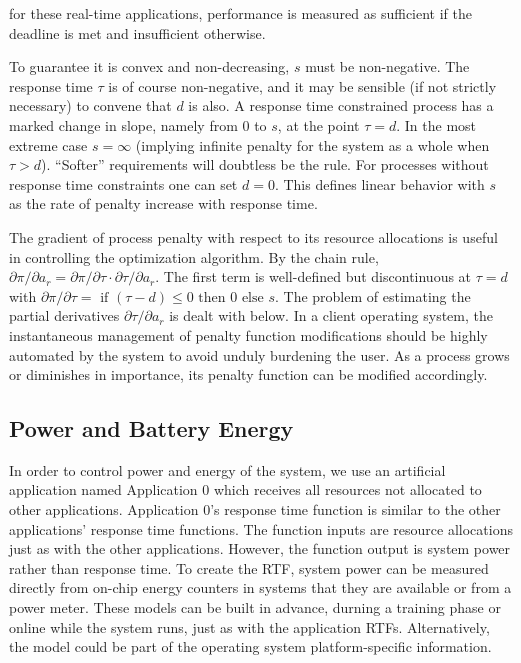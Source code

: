 for these real-time applications, performance is measured as sufficient if the deadline is met and insufficient otherwise.

To guarantee it is convex and non-decreasing, $s$ must be non-negative.
The response time $\tau$  is of course non-negative,
and it may be sensible (if not strictly necessary) to convene that $d$ is also.
A response time constrained process has a marked change in slope, namely from 0 to $s$, at the point $\tau= d$.
In the most extreme case $s = \infty$ (implying infinite penalty for the system as a whole when $\tau > d$).  ``Softer'' requirements will doubtless be the rule.
For processes without response time constraints one can set $d = 0$.
This defines linear behavior with $s$ as the rate of penalty increase with response time.

The gradient of process penalty with respect to its resource allocations is useful in controlling the optimization algorithm.
By the chain rule, $\partial\pi/\partial a_r = \partial\pi/\partial\tau\cdot\partial\tau/\partial a_r$.
The first term is well-defined but discontinuous at $\tau = d$ with
$\partial\pi/\partial\tau = \mbox{ if } (\tau - d) \leq 0 \mbox{ then } 0 \mbox{ else } s$.
The problem of estimating the partial derivatives $\partial\tau/\partial a_r$ is dealt with below.
In a client operating system, the instantaneous management of penalty function modifications
should be highly automated by the system to avoid unduly burdening the user.
As a process grows or diminishes in importance, its penalty function can be modified accordingly.

\subsection*{Power and Battery Energy}
In order to control power and energy of the system, we use an artificial application named Application 0 which receives all resources not allocated to other applications. Application 0's response time function is similar to the other applications' response time functions.  The function inputs are resource allocations just as with the other applications.  However, the function output is system power rather than response time.   To create the RTF, system power can be measured directly from on-chip energy counters in systems that they are available or from a power meter.  These models can be built in advance, durning a training phase or online while the system runs, just as with the application RTFs.  Alternatively, the model could be part of the operating system platform-specific information. 

